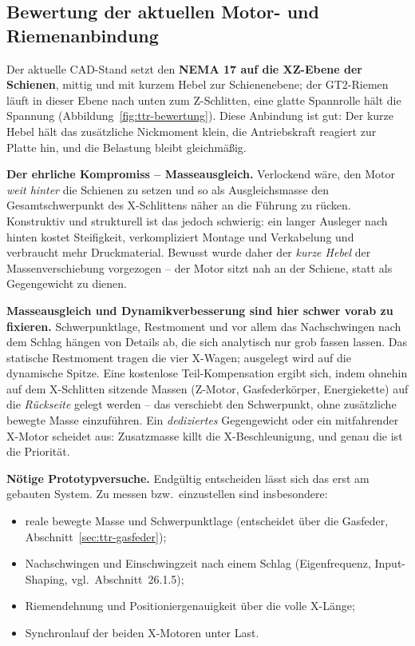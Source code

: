 \subsection{Bewertung der aktuellen Motor- und Riemenanbindung}
\label{sec:ttr-bewertung}

Der aktuelle CAD-Stand setzt den \textbf{NEMA 17 auf die XZ-Ebene der Schienen},
mittig und mit kurzem Hebel zur Schienenebene; der GT2-Riemen l\"auft in dieser
Ebene nach unten zum Z-Schlitten, eine glatte Spannrolle h\"alt die Spannung
(Abbildung~\ref{fig:ttr-bewertung}). Diese Anbindung ist gut: Der kurze Hebel
h\"alt das zus\"atzliche Nickmoment klein, die Antriebskraft reagiert zur Platte
hin, und die Belastung bleibt gleichm\"a\ss ig.

\textbf{Der ehrliche Kompromiss -- Masseausgleich.} Verlockend w\"are, den Motor
\emph{weit hinter} die Schienen zu setzen und so als Ausgleichsmasse den
Gesamtschwerpunkt des X-Schlittens n\"aher an die F\"uhrung zu r\"ucken.
Konstruktiv und strukturell ist das jedoch schwierig: ein langer Ausleger nach
hinten kostet Steifigkeit, verkompliziert Montage und Verkabelung und
verbraucht mehr Druckmaterial. Bewusst wurde daher der \emph{kurze Hebel} der
Massenverschiebung vorgezogen -- der Motor sitzt nah an der Schiene, statt als
Gegengewicht zu dienen.

\textbf{Masseausgleich und Dynamikverbesserung sind hier schwer vorab zu
fixieren.} Schwerpunktlage, Restmoment und vor allem das Nachschwingen nach dem
Schlag h\"angen von Details ab, die sich analytisch nur grob fassen lassen. Das
statische Restmoment tragen die vier X-Wagen; ausgelegt wird auf die dynamische
Spitze. Eine kostenlose Teil-Kompensation ergibt sich, indem ohnehin auf dem
X-Schlitten sitzende Massen (Z-Motor, Gasfederk\"orper, Energiekette) auf die
\emph{R\"uckseite} gelegt werden -- das verschiebt den Schwerpunkt, ohne
zus\"atzliche bewegte Masse einzuf\"uhren. Ein \emph{dediziertes} Gegengewicht
oder ein mitfahrender X-Motor scheidet aus: Zusatzmasse killt die
X-Beschleunigung, und genau die ist die Priorit\"at.

\textbf{N\"otige Prototypversuche.} Endg\"ultig entscheiden l\"asst sich das erst
am gebauten System. Zu messen bzw.\ einzustellen sind insbesondere:
\begin{itemize}
  \item reale bewegte Masse und Schwerpunktlage (entscheidet \"uber die
        Gasfeder, Abschnitt~\ref{sec:ttr-gasfeder});
  \item Nachschwingen und Einschwingzeit nach einem Schlag (Eigenfrequenz,
        Input-Shaping, vgl.\ Abschnitt~26.1.5);
  \item Riemendehnung und Positioniergenauigkeit \"uber die volle X-L\"ange;
  \item Synchronlauf der beiden X-Motoren unter Last.
\end{itemize}

